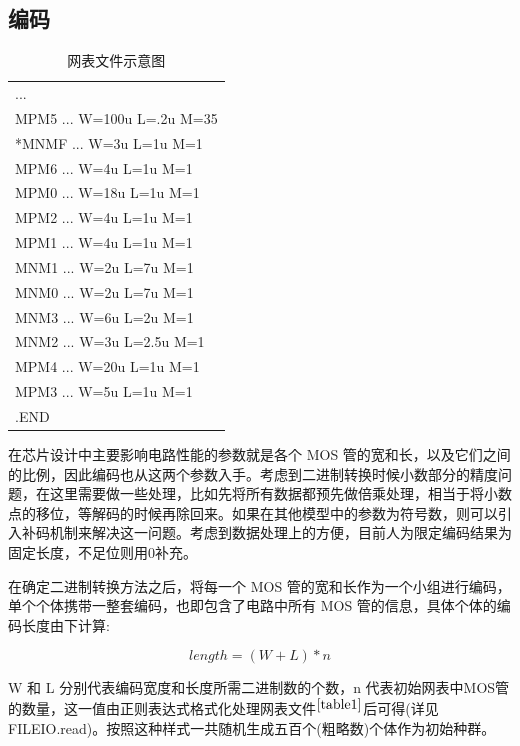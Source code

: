 \documentclass[14pt, a4paper]{article}
\begin{document}
    \subsection{编码}
        \begin{table}[htbp]
            \centering
            \begin{tabular}{|l|}
                \hline
                ... \\
                MPM5 ... W=100u L=.2u M=35 \\
                *MNMF ... W=3u L=1u M=1 \\
                MPM6 ... W=4u L=1u M=1 \\
                MPM0 ... W=18u L=1u M=1 \\
                
                MPM2 ... W=4u L=1u M=1 \\
                MPM1 ... W=4u L=1u M=1 \\
                MNM1 ... W=2u L=7u M=1 \\
                MNM0 ... W=2u L=7u M=1 \\
                
                MNM3 ... W=6u L=2u M=1 \\
                MNM2 ... W=3u L=2.5u M=1 \\
                MPM4 ... W=20u L=1u M=1 \\
                MPM3 ... W=5u L=1u M=1 \\
                .END \\
                \hline
            \end{tabular}
            \caption{网表文件示意图}
            \label{table1}
        \end{table}
        在芯片设计中主要影响电路性能的参数就是各个 MOS 管的宽和长，以及它们之间的比例，因此编码也从这两个参数入手。考虑到二进制转换时候小数部分的精度问题，在这里需要做一些处理，比如先将所有数据都预先做倍乘处理，相当于将小数点的移位，等解码的时候再除回来。如果在其他模型中的参数为符号数，则可以引入补码机制来解决这一问题。考虑到数据处理上的方便，目前人为限定编码结果为固定长度，不足位则用0补充。
        
        在确定二进制转换方法之后，将每一个 MOS 管的宽和长作为一个小组进行编码，单个个体携带一整套编码，也即包含了电路中所有 MOS 管的信息，具体个体的编码长度由下计算:
        
        $$length = (W + L) * n$$
        
        W 和 L 分别代表编码宽度和长度所需二进制数的个数，n 代表初始网表中MOS管的数量，这一值由正则表达式格式化处理网表文件$^{\ref{table1}}$后可得(详见FILEIO.read)。按照这种样式一共随机生成五百个(粗略数)个体作为初始种群。
\end{document}
